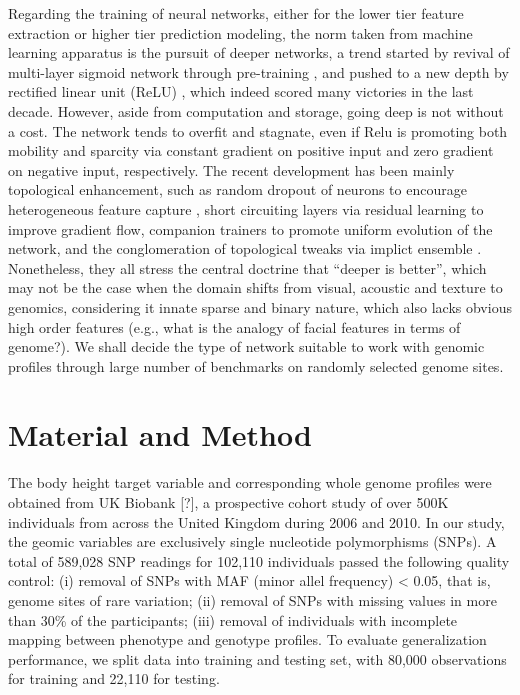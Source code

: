 \documentclass[acmtog, authorversion]{acmart}
\begin{document}
Regarding the training of neural networks, either for the lower tier feature extraction or higher tier prediction modeling, the norm taken from machine learning apparatus is the pursuit of deeper networks, a trend started by revival of multi-layer sigmoid network through pre-training \cite{DL:Intro1}, and pushed to a new depth by rectified linear unit (ReLU) \cite{DL:Relu1}, which indeed scored many victories in the last decade\cite{DL:Intro2, DL:Intro3}. However, aside from computation and storage, going deep is not without a cost. The network tends to overfit and stagnate, even if Relu is promoting both mobility and sparcity via constant gradient on positive input and zero gradient on negative input, respectively. The recent development has been mainly topological enhancement, such as random dropout of neurons to encourage heterogeneous feature capture \cite{DL:DRP1}, short circuiting layers via residual learning to improve gradient flow\cite{DL:DRL1}, companion trainers to promote uniform evolution of the network, and the conglomeration of topological tweaks via implict ensemble \cite{DL:SWP1}. Nonetheless, they all stress the central doctrine that ``deeper is better'', which may not be the case when the domain shifts from visual, acoustic and texture to genomics, considering it innate sparse and binary nature, which also lacks obvious high order features (e.g., what is the analogy of facial features in terms of genome?). We shall decide the type of network suitable to work with genomic profiles through large number of benchmarks on randomly selected genome sites.

\section{Material and Method}
The body height target variable and corresponding whole genome profiles were obtained from UK Biobank [?], a prospective cohort study of over 500K individuals from across the United Kingdom during 2006 and 2010. In our study, the geomic variables are exclusively single nucleotide polymorphisms (SNPs). A total of 589,028 SNP readings for 102,110 individuals passed the following quality control: (i) removal of SNPs with MAF (minor allel frequency) < 0.05, that is, genome sites of rare variation; (ii) removal of SNPs with missing values in more than 30\% of the participants; (iii) removal of individuals with incomplete mapping between phenotype and genotype profiles. To evaluate generalization performance, we split data into training and testing set, with 80,000 observations for training and 22,110 for testing. 
\end{document}
